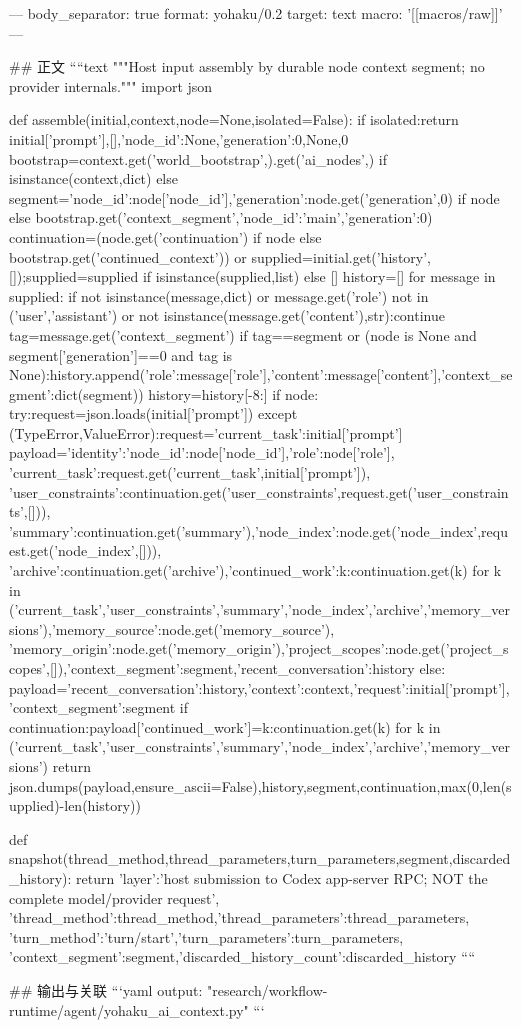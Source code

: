 ---
body_separator: true
format: yohaku/0.2
target: text
macro: '[[macros/raw]]'
---

## 正文
````text
"""Host input assembly by durable node context segment; no provider internals."""
import json

def assemble(initial,context,node=None,isolated=False):
 if isolated:return initial['prompt'],[],{'node_id':None,'generation':0},None,0
 bootstrap=context.get('world_bootstrap',{}).get('ai_nodes',{}) if isinstance(context,dict) else {}
 segment={'node_id':node['node_id'],'generation':node.get('generation',0)} if node else bootstrap.get('context_segment',{'node_id':'main','generation':0})
 continuation=(node.get('continuation') if node else bootstrap.get('continued_context')) or {}
 supplied=initial.get('history',[]);supplied=supplied if isinstance(supplied,list) else []
 history=[]
 for message in supplied:
  if not isinstance(message,dict) or message.get('role') not in ('user','assistant') or not isinstance(message.get('content'),str):continue
  tag=message.get('context_segment')
  if tag==segment or (node is None and segment['generation']==0 and tag is None):history.append({'role':message['role'],'content':message['content'],'context_segment':dict(segment)})
 history=history[-8:]
 if node:
  try:request=json.loads(initial['prompt'])
  except (TypeError,ValueError):request={'current_task':initial['prompt']}
  payload={'identity':{'node_id':node['node_id'],'role':node['role']},
           'current_task':request.get('current_task',initial['prompt']),
           'user_constraints':continuation.get('user_constraints',request.get('user_constraints',[])),
           'summary':continuation.get('summary'),'node_index':node.get('node_index',request.get('node_index',[])),
           'archive':continuation.get('archive'),'continued_work':{k:continuation.get(k) for k in ('current_task','user_constraints','summary','node_index','archive','memory_versions')},'memory_source':node.get('memory_source'),
           'memory_origin':node.get('memory_origin'),'project_scopes':node.get('project_scopes',[]),'context_segment':segment,'recent_conversation':history}
 else:
  payload={'recent_conversation':history,'context':context,'request':initial['prompt'],'context_segment':segment}
  if continuation:payload['continued_work']={k:continuation.get(k) for k in ('current_task','user_constraints','summary','node_index','archive','memory_versions')}
 return json.dumps(payload,ensure_ascii=False),history,segment,continuation,max(0,len(supplied)-len(history))

def snapshot(thread_method,thread_parameters,turn_parameters,segment,discarded_history):
 return {'layer':'host submission to Codex app-server RPC; NOT the complete model/provider request',
         'thread_method':thread_method,'thread_parameters':thread_parameters,
         'turn_method':'turn/start','turn_parameters':turn_parameters,
         'context_segment':segment,'discarded_history_count':discarded_history}
````

## 输出与关联
```yaml
output: "research/workflow-runtime/agent/yohaku_ai_context.py"
```

